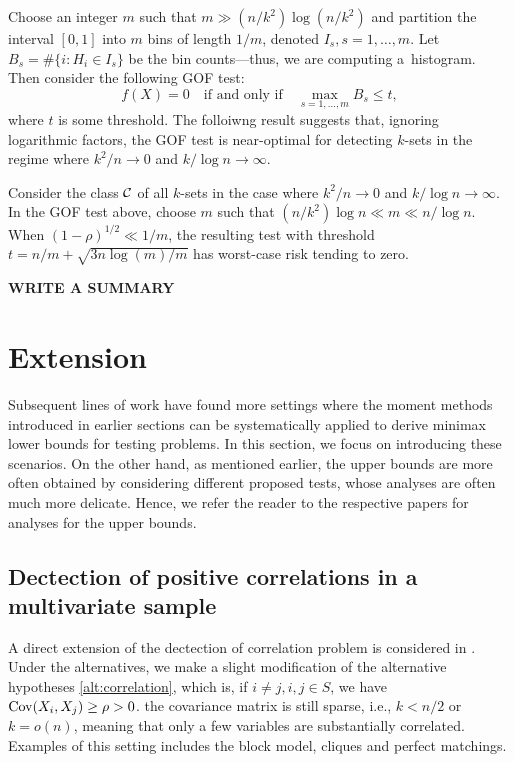 \documentclass[10pt, oneside]{article}
\begin{document}
Choose an integer $m$ such that $m \gg(n/k^2) \log(n/k^2)$ and partition
the interval $[0,1]$ into $m$ bins of length $1/m$, denoted $I_s,  s =
1,\ldots, m$. Let $B_s = \# \{i: H_i \in I_s\}$ be the bin
counts---thus, we are computing a~histogram. Then consider the
following GOF test:
%
\[
f(X)=0  \quad\mbox{if and only if}\quad
\max_{s = 1,\ldots, m} B_s \leq t,
\]
%
where $t$ is some threshold. The folloiwng result suggests that, ignoring logarithmic factors, the GOF test is near-optimal for detecting $k$-sets in
the regime where $k^2/n \to0$ and $k/\log n \to\infty$.

\begin{prop} \label{prpgof}
Consider the class ${\mathcal C}$ of all $k$-sets in the case where $k^2/n \to
0$ and $k/\log n \to\infty$. In the GOF test above, choose $m$ such
that $(n/k^2) \log n \ll m \ll n/\log n$. When $(1-\rho)^{1/2} \ll
1/m$, the resulting test with threshold $t = n/m + \sqrt{3 n \log(m)/m}$ has
worst-case risk tending to zero.
\end{prop}

{\bf WRITE A SUMMARY}

\section{Extension}

Subsequent lines of work have found more settings where the moment methods introduced in earlier sections can be systematically applied to derive minimax lower bounds for testing problems. In this section, we focus on introducing these scenarios. 
On the other hand, as mentioned earlier, the upper bounds are more often obtained by considering different proposed tests, whose analyses are often much more delicate. Hence, we refer the reader to the respective papers for analyses for the upper bounds.

\subsection{Dectection of positive correlations in a multivariate sample}
A direct extension of the dectection of correlation problem is considered in \cite{arias2015correlations}. Under the alternatives, we make a slight modification of the alternative hypotheses \ref{alt:correlation}, which is, if $i \ne j, i,j \in S$, we have $\operatorname{Cov}(X_i, X_j) \ge \rho > 0$.  the covariance matrix is still sparse, i.e., $k < n/2$ or $k = o(n)$, meaning that only a few variables are substantially correlated. Examples of this setting includes the block model, cliques and perfect matchings. 
\end{document}

